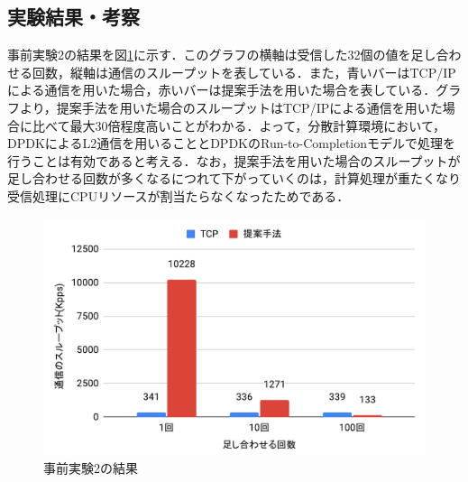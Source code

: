\subsection{実験結果・考察}
事前実験2の結果を図\ref{fig:PreEvaluationTwoResult}に示す．このグラフの横軸は受信した32個の値を足し合わせる回数，縦軸は通信のスループットを表している．また，青いバーはTCP/IPによる通信を用いた場合，赤いバーは提案手法を用いた場合を表している．グラフより，提案手法を用いた場合のスループットはTCP/IPによる通信を用いた場合に比べて最大30倍程度高いことがわかる．よって，分散計算環境において，DPDKによるL2通信を用いることとDPDKのRun-to-Completionモデルで処理を行うことは有効であると考える．なお，提案手法を用いた場合のスループットが足し合わせる回数が多くなるにつれて下がっていくのは，計算処理が重たくなり受信処理にCPUリソースが割当たらなくなったためである．

\begin{figure}[htb]
  \centering
  \includegraphics[width=\columnwidth]{pictures/PreExperimentTwoResult.pdf}
  \caption{事前実験2の結果}
  \label{fig:PreEvaluationTwoResult}
\end{figure}
